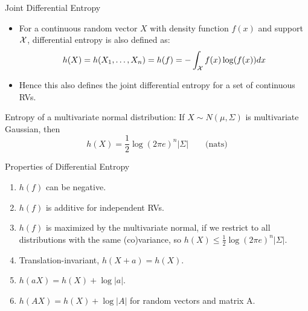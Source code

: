 \documentclass[11pt,compress,t,notes=noshow, xcolor=table]{beamer}
\begin{document}
\begin{vbframe}{Joint Differential Entropy} 
\begin{itemize}
\item For a continuous random vector $X$ with density function $f(x)$ and support $\mathcal{X}$, 
  differential entropy is also defined as:
$$ h(X) = h(X_1, \ldots, X_n) = h(f) = - \int_{\mathcal{X}} f(x) \log(f(x)) dx $$
\item Hence this also defines the joint differential entropy for a set of continuous RVs.
\end{itemize}

\lz
  
Entropy of a multivariate normal distribution: 
If $X \sim N(\mu, \Sigma)$ is multivariate Gaussian, then
  $$h(X) = \frac{1}{2} \log(2 \pi e)^n |\Sigma| \qquad \text{(nats)}$$
\end{vbframe}

\begin{vbframe}{Properties of Differential Entropy} 
\begin{enumerate}
  \item $h(f)$ can be negative.
  \item $h(f)$ is additive for independent RVs.
  \item $h(f)$ is maximized by the multivariate normal, if we restrict 
    to all distributions with the same (co)variance, so
    $h(X) \leq \frac{1}{2} \log(2 \pi e)^n |\Sigma|.$
\item Translation-invariant, $ h(X+a) = h(X)$. 
\item $h(aX) = h(X) + \log |a|$.
\item $h(AX) = h(X) + \log |A|$ for random vectors and matrix A.
\end{enumerate}
\end{vbframe}

\endlecture
\end{document}
